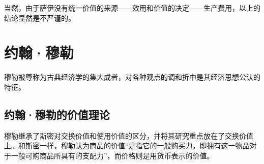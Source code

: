当然，由于萨伊没有统一价值的来源——效用和价值的决定——生产费用，以上的结论显然是不严谨的。

\section{约翰·穆勒}

 穆勒被尊称为古典经济学的集大成者，对各种观点的调和折中是其经济思想公认的特征\cite[165]{YanZhiJieXiFangJingJiXueShuoShiJiaoChengDiErBan2013}\cite[176-178]{CaiJiMingCongGuDianZhengZhiJingJiXueDaoZhongGuoTeSeSheHuiZhuYiZhengZhiJingJiXueJiYuZhongGuoShiJiaoDeZhengZhiJingJiXueYanBianShangCe2023}。
 
 \subsection{约翰·穆勒的价值理论}

 穆勒继承了斯密对交换价值和使用价值的区分，并将其研究重点放在了交换价值上。和斯密一样，穆勒认为商品的价值“是指它的一般购买力，即拥有这一物品对于一般可购商品所具有的支配力”，而价格则是用货币表示的价值\cite[493]{YueHan*MuLeZhengZhiJingJiXueYuanLiJiQiZaiSheHuiZheXueShangDeRuoGanYingYongShangJuan1991}。

